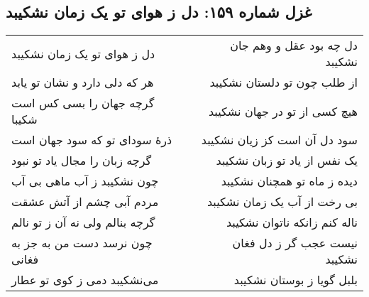 \begin{center}
\section*{غزل شماره ۱۵۹: دل ز هوای تو یک زمان نشکیبد}
\label{sec:159}
\begin{longtable}{l p{0.5cm} r}
دل ز هوای تو یک زمان نشکیبد
&&
دل چه بود عقل و وهم جان نشکیبد
\\
هر که دلی دارد و نشان تو یابد
&&
از طلب چون تو دلستان نشکیبد
\\
گرچه جهان را بسی کس است شکیبا
&&
هیچ کسی از تو در جهان نشکیبد
\\
ذرهٔ سودای تو که سود جهان است
&&
سود دل آن است کز زیان نشکیبد
\\
گرچه زبان را مجال یاد تو نبود
&&
یک نفس از یاد تو زبان نشکیبد
\\
چون نشکیبد ز آب ماهی بی آب
&&
دیده ز ماه تو همچنان نشکیبد
\\
مردم آبی چشم از آتش عشقت
&&
بی رخت از آب یک زمان نشکیبد
\\
گرچه بنالم ولی نه آن ز تو نالم
&&
ناله کنم زانکه ناتوان نشکیبد
\\
چون نرسد دست من به جز به فغانی
&&
نیست عجب گر ز دل فغان نشکیبد
\\
می‌نشکیبد دمی ز کوی تو عطار
&&
بلبل گویا ز بوستان نشکیبد
\\
\end{longtable}
\end{center}
